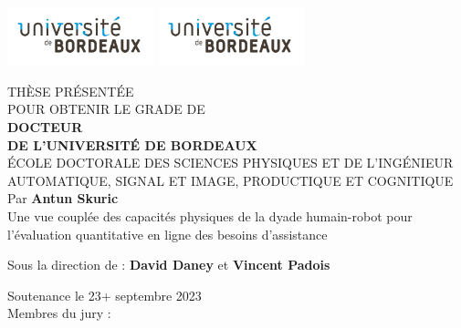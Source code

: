 \documentclass[french,12pt,a4paper]{report}
\begin{document}
\pagestyle{empty}
\includegraphics[scale=1, height=1.7cm]{first_page/brdx.pdf}
\hfill
\includegraphics[scale=1, height=1.7cm]{first_page/brdx.pdf}
\hfill
\begin{center}
\doublespacing
\begin{Large}

THÈSE PRÉSENTÉE\\ POUR OBTENIR LE GRADE DE \\
{\LARGE \textbf{DOCTEUR\\DE L'UNIVERSITÉ DE BORDEAUX} } \\
\vspace{0.55cm}
ÉCOLE DOCTORALE DES SCIENCES PHYSIQUES ET DE L’INGÉNIEUR \\
{\normalsize AUTOMATIQUE, SIGNAL ET IMAGE, PRODUCTIQUE ET COGNITIQUE} \\
\vspace{0.55cm}
Par \textbf{Antun Skuric} \\
\vspace{0.55cm}
{\Large Une vue couplée des capacités physiques de la dyade humain-robot pour l'évaluation quantitative en ligne des besoins d'assistance}
\end{Large}
\vspace{0.55cm}
\begin{normalsize}
\begin{singlespace}
Sous la direction de : \textbf{David Daney} et  \textbf{Vincent Padois}
\end{singlespace}
\end{normalsize}
\end{center}
\vfill
{\large Soutenance le 23+ septembre 2023 }\\
\vfill
Membres du jury :
\end{document}
